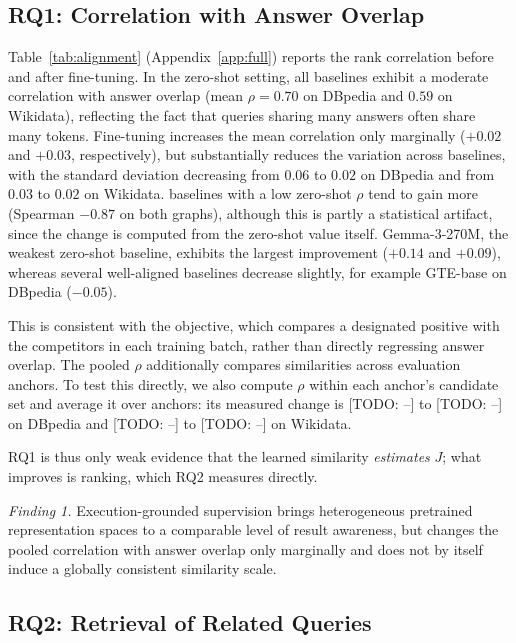 \documentclass[runningheads]{llncs}
\newcommand{\hp}[1]{{\color{red!75!black}#1}}
\begin{document}
\subsection{RQ1: Correlation with Answer Overlap}
\label{sec:rq1}

Table~\ref{tab:alignment} (Appendix~\ref{app:full}) reports the rank
correlation before and after fine-tuning. In the zero-shot setting, all baselines exhibit a moderate
correlation with answer overlap (mean $\rho = 0.70$ on DBpedia and $0.59$ on
Wikidata), reflecting the fact that queries sharing many answers often share
many tokens. Fine-tuning increases the mean correlation only marginally
($+0.02$ and $+0.03$, respectively), but substantially reduces the variation
across baselines, with the standard deviation decreasing from $0.06$ to $0.02$
on DBpedia and from $0.03$ to $0.02$ on Wikidata. baselines with a low
zero-shot $\rho$ tend to gain more (Spearman $-0.87$ on both graphs), although
this is partly a statistical artifact, since the change is computed from the
zero-shot value itself. Gemma-3-270M, the weakest zero-shot baseline, exhibits the largest improvement
($+0.14$ and $+0.09$), whereas several well-aligned baselines decrease
slightly, for example GTE-base on DBpedia ($-0.05$).

This is consistent with the objective, which compares a designated positive
with the competitors in each training batch, rather than directly regressing
answer overlap. The pooled $\rho$ additionally compares similarities across
evaluation anchors. To test this
directly, we also compute $\rho$ within each anchor's candidate set and
average it over anchors: its measured change is \hp{[TODO: --]} to \hp{[TODO: --]} on
DBpedia and \hp{[TODO: --]} to \hp{[TODO: --]} on Wikidata.

RQ1 is thus only weak evidence that the learned similarity
\emph{estimates} $J$; what improves is ranking, which RQ2 measures directly.

\textit{Finding 1.} Execution-grounded supervision brings heterogeneous
pretrained representation spaces to a comparable level of result awareness,
but changes the pooled correlation with answer overlap only marginally and
does not by itself induce a globally consistent similarity scale.

\subsection{RQ2: Retrieval of Related Queries}
\label{sec:rq2}
\end{document}
